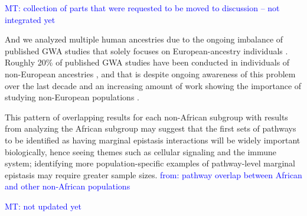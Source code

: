 \documentclass[12pt,a4paper]{article}
\begin{document}
\textcolor{blue}{MT: collection of parts that were requested to be moved to discussion -- not integrated yet}



And we analyzed multiple human ancestries due to the ongoing imbalance of published GWA studies that solely focuses on European-ancestry individuals \citep{Need2009,Popejoy2016,Gurdasani2019,Martin2019,Sirugo2019}. Roughly 20\% of published GWA studies have been conducted in individuals of non-European ancestries \citep{Gurdasani2019,Martin2019,Sirugo2019}, and that is despite ongoing awareness of this problem over the last decade \citep{Need2009,Popejoy2016} and an increasing amount of work showing the importance of studying non-European populations \citep{Dumitrescu2011,Martin2017a,Martin2017b,Mogil2018,Bien2019,Duncan2019,Kuchenbaecker2019,Wojcik2019,Zhong2019,Marnetto2020,Mostafavi2020}.





This pattern of overlapping results for each non-African subgroup with results from analyzing  the African subgroup may suggest that the first sets of pathways to be identified as having marginal epistasis interactions will be widely important biologically, hence seeing themes such as cellular signaling and the immune system; identifying more population-specific examples of pathway-level marginal epistasis may require greater sample sizes. \textcolor{blue}{from: pathway overlap between African and other non-African populations}





\textcolor{blue}{MT: not updated yet}


\fi
\end{document}
